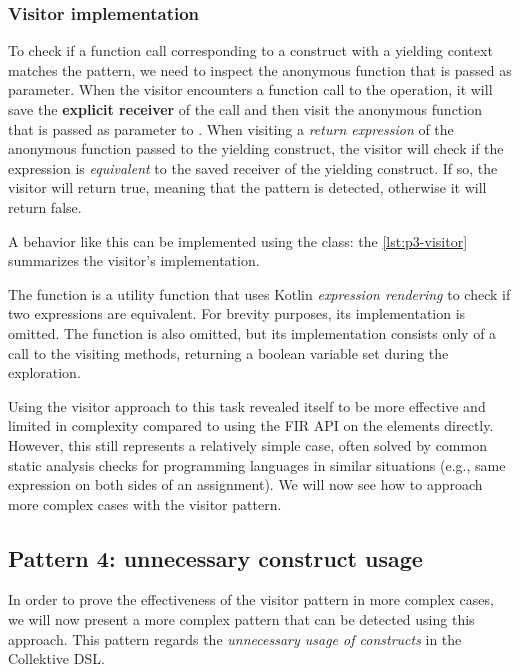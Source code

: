 \documentclass[12pt,a4paper,openright,twoside]{book}
\begin{document}
\subsubsection{Visitor implementation}

To check if a function call corresponding to a construct with a yielding context
matches the pattern, we need to inspect the anonymous function that is passed as
parameter. When the visitor encounters a function call to the 
operation, it will save the \textbf{explicit receiver} of the call and then
visit the anonymous function that is passed as parameter to .
%
When visiting a \emph{return expression} of the anonymous function
passed to the yielding construct, the visitor will check if the expression is
\emph{equivalent} to the saved receiver of the yielding construct.
%
If so, the visitor will return true, meaning that the pattern is detected,
otherwise it will return false. 

A behavior like this can be implemented using the 
class: the \cref{lst:p3-visitor} summarizes the visitor's implementation.



The function  is a utility function that
uses Kotlin \emph{expression rendering} to check if two expressions are 
equivalent. For brevity purposes, its implementation is omitted.
%
The function  is also omitted, but its
implementation consists only of a call to the visiting methods, returning a
boolean variable set during the exploration.

Using the visitor approach to this task revealed itself to be more effective and
limited in complexity compared to using the \ac{FIR} API on the elements
directly. However, this still represents a relatively simple case, often solved
by common static analysis checks for programming languages in similar situations
(e.g., same expression on both sides of an assignment). We will now see how to
approach more complex cases with the visitor pattern.

\subsection{Pattern 4: unnecessary construct usage}

In order to prove the effectiveness of the visitor pattern in more complex cases,
we will now present a more complex pattern that can be detected using this
approach. This pattern regards the \emph{unnecessary usage of constructs} in the
Collektive \ac{DSL}.
\end{document}
